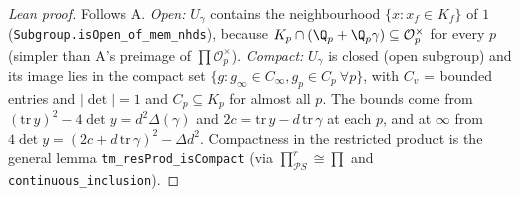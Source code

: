 \begin{proof}[Lean proof]
Follows A. \emph{Open:} $U_\gamma$ contains the neighbourhood $\{x:x_f\in K_f\}$ of $1$ (\texttt{Subgroup.isOpen\_of\_mem\_nhds}), because $K_p\cap(\Q_p+\Q_p\gamma)\subseteq\mathcal O_p^\times$ for every $p$ (simpler than A's preimage of $\prod\mathcal O_p^\times$). \emph{Compact:} $U_\gamma$ is closed (open subgroup) and its image lies in the compact set $\{g:g_\infty\in C_\infty,g_p\in C_p\ \forall p\}$, with $C_v$ = bounded entries and $|\det|=1$ and $C_p\subseteq K_p$ for almost all $p$. The bounds come from $(\mathrm{tr}\,y)^2-4\det y=d^2\Delta(\gamma)$ and $2c=\mathrm{tr}\,y-d\,\mathrm{tr}\,\gamma$ at each $p$, and at $\infty$ from $4\det y=(2c+d\,\mathrm{tr}\,\gamma)^2-\Delta d^2$. Compactness in the restricted product is the general lemma \texttt{tm\_resProd\_isCompact} (via $\prod^r_{\mathcal P S}\cong\prod$ and \texttt{continuous\_inclusion}).
\end{proof}


